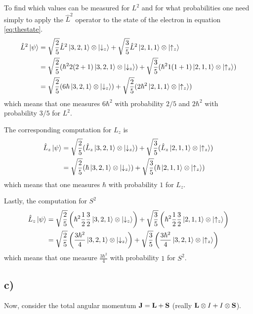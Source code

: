 \documentclass[]{article}
\begin{document}
To find which values can be measured for $L^2$ and for what probabilities one need simply to apply the $\hat{L}^2$ operator to the state of the electron in equation \ref{eq:thestate}.
\begin{align*}
\hat{L}^2\ket{\psi}
&=\sqrt{\frac{2}{5}}\hat{L}^2\ket{3,2,1}\otimes\ket{\downarrow_z}
+ \sqrt{\frac{3}{5}}\hat{L}^2\ket{2,1,1}\otimes\ket{\uparrow_z} \\
&=\sqrt{\frac{2}{5}}(\hbar^22(2+1)\ket{3,2,1}\otimes\ket{\downarrow_z})
+ \sqrt{\frac{3}{5}}(\hbar^21(1+1)\ket{2,1,1}\otimes\ket{\uparrow_z}) \\
&=\sqrt{\frac{2}{5}}(6\hbar\ket{3,2,1}\otimes\ket{\downarrow_z})
+ \sqrt{\frac{2}{5}}(2\hbar^2\ket{2,1,1}\otimes\ket{\uparrow_z})
\end{align*}
which means that one measures $6\hbar^2$ with probability $2/5$ and $2\hbar^2$ with probability $3/5$ for $L^2$. 

The corresponding computation for $L_z$ is
\begin{align*}
\hat{L}_z\ket{\psi}
&=\sqrt{\frac{2}{5}}(\hat{L}_z\ket{3,2,1}\otimes\ket{\downarrow_z})
+ \sqrt{\frac{3}{5}}(\hat{L}_z\ket{2,1,1}\otimes\ket{\uparrow_z}) \\
&=\sqrt{\frac{2}{5}}(\hbar\ket{3,2,1}\otimes\ket{\downarrow_z})
+ \sqrt{\frac{3}{5}}(\hbar\ket{2,1,1}\otimes\ket{\uparrow_z}) \\
\end{align*}
which means that one measures $\hbar$ with probability $1$ for $L_z$.

Lastly, the computation for $S^2$
\begin{align*}
\hat{L}_z\ket{\psi} 
&=\sqrt{\frac{2}{5}}\left(\hbar^2\frac{1}{2}\frac{3}{2}\ket{3,2,1}\otimes\ket{\downarrow_z}\right)
+ \sqrt{\frac{3}{5}}\left(\hbar^2\frac{1}{2}\frac{3}{2}\ket{2,1,1}\otimes\ket{\uparrow_z}\right)\\
&=\sqrt{\frac{2}{5}}\left(\frac{3\hbar^2}{4}\ket{3,2,1}\otimes\ket{\downarrow_z}\right)
+ \sqrt{\frac{3}{5}}\left(\frac{3\hbar^2}{4}\ket{3,2,1}\otimes\ket{\uparrow_z}\right)
\end{align*}
which means that one measure $\frac{3\hbar^2}{4}$ with probability $1$ for $S^2$.

\subsection*{c)}
Now, consider the total angular momentum $\vb{J}=\vb{L}+\vb{S}$ (really $\vb{L}\otimes I + I \otimes\vb{S}$).
\end{document}
